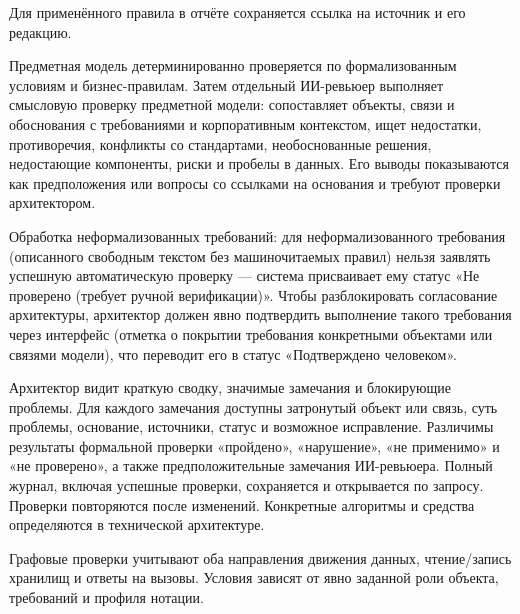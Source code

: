 \documentclass[10pt,a4paper]{article}
\begin{document}
Для применённого правила в отчёте сохраняется ссылка на источник и его редакцию.

Предметная модель детерминированно проверяется по формализованным условиям и бизнес-правилам. Затем отдельный ИИ-ревьюер выполняет смысловую проверку предметной модели: сопоставляет объекты, связи и обоснования с требованиями и корпоративным контекстом, ищет недостатки, противоречия, конфликты со стандартами, необоснованные решения, недостающие компоненты, риски и пробелы в данных. Его выводы показываются как предположения или вопросы со ссылками на основания и требуют проверки архитектором.

Обработка неформализованных требований: для неформализованного требования (описанного свободным текстом без машиночитаемых правил) нельзя заявлять успешную автоматическую проверку --- система присваивает ему статус «Не проверено (требует ручной верификации)». Чтобы разблокировать согласование архитектуры, архитектор должен явно подтвердить выполнение такого требования через интерфейс (отметка о покрытии требования конкретными объектами или связями модели), что переводит его в статус «Подтверждено человеком».

Архитектор видит краткую сводку, значимые замечания и блокирующие проблемы. Для каждого замечания доступны затронутый объект или связь, суть проблемы, основание, источники, статус и возможное исправление. Различимы результаты формальной проверки «пройдено», «нарушение», «не применимо» и «не проверено», а также предположительные замечания ИИ-ревьюера. Полный журнал, включая успешные проверки, сохраняется и открывается по запросу. Проверки повторяются после изменений. Конкретные алгоритмы и средства определяются в технической архитектуре.

Графовые проверки учитывают оба направления движения данных, чтение/запись хранилищ и ответы на вызовы. Условия зависят от явно заданной роли объекта, требований и профиля нотации.
\end{document}
